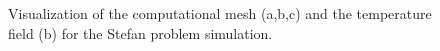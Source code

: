 \begin{figure}[ht!]
\begin{center}
\caption{Visualization of the computational mesh (a,b,c) and the temperature field (b) for the Stefan problem simulation.} \label{fig:stefan_grid}
\end{center}
\end{figure}

